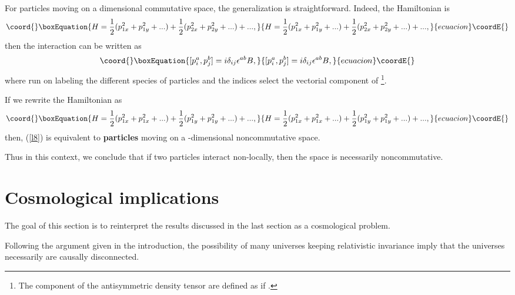\documentclass[a4paper,aps,twocolumn,amsfonts]{revtex4}
\begin{document}
   For \coordHE{} particles moving on a \coordHE{} dimensional  commutative space, the generalization is straightforward. Indeed,  the Hamiltonian is 
   \begin{equation}\coord{}\boxEquation{
   H =  \frac{1}{2} (p^2_{1x} +p^2_{1y}+ ...) + \frac{1}{2} (p^2_{2x} +p^2_{2y}+ ...) + ... ,  \label{l6}
   }{
   H =  \frac{1}{2} (p^2_{1x} +p^2_{1y}+ ...) + \frac{1}{2} (p^2_{2x} +p^2_{2y}+ ...) + ... ,  }{ecuacion}\coordE{}\end{equation}
    then the interaction can be written as 
   \begin{equation}\coord{}\boxEquation{
   [ p_i^a, p_j^b] = i \delta_{ij} \epsilon^{ab} B, \label{l7}
   }{
   [ p_i^a, p_j^b] = i \delta_{ij} \epsilon^{ab} B, }{ecuacion}\coordE{}\end{equation}
   where \coordHE{} run on  \coordHE{} labeling the different species of particles and the indices \coordHE{} select the vectorial component of 
   \coordHE{}  \footnote{The component of the antisymmetric density tensor \coordHE{} are  defined as \coordHE{} if \coordHE{}.}.

   If we rewrite the Hamiltonian as
   \begin{equation}\coord{}\boxEquation{
   H =  \frac{1}{2} (p^2_{1x} +p^2_{1x}+ ...) + \frac{1}{2} (p^2_{1y} +p^2_{1y}+ ...) + ... ,  \label{l8}
   }{
   H =  \frac{1}{2} (p^2_{1x} +p^2_{1x}+ ...) + \frac{1}{2} (p^2_{1y} +p^2_{1y}+ ...) + ... ,  }{ecuacion}\coordE{}\end{equation}
   then, (\ref{l8}) is equivalent to {\bf {}\coordHE{} particles} moving on a \coordHE{}-dimensional  noncommutative space.

   Thus in this context, we conclude that if two particles interact non-locally, then the space is necessarily noncommutative.

   \section{Cosmological implications}

   The goal of this section is to reinterpret the results discussed in the last section as a cosmological problem.

   Following the argument given in the introduction, the possibility of many universes keeping  relativistic invariance imply that the universes necessarily are causally disconnected.
\end{document}
